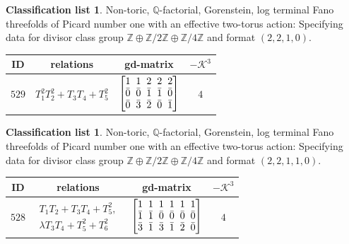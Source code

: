 \documentclass[10pt,a4paper]{amsart}
\theoremstyle{definition}
\newtheorem{class-list}[thm]{Classification list}
\def\ZZ{{\mathbb Z}}
\def\QQ{{\mathbb Q}}
\numberwithin{equation}{section}
\begin{document}
\begin{class-list}\label{class-list(0,2,4)}
Non-toric, $\QQ$-factorial, Gorenstein, log terminal Fano
threefolds of Picard number one with an effective two-torus action:
Specifying data for divisor class group
$\ZZ\oplus \ZZ/2\ZZ\oplus \ZZ/4\ZZ$ and format $(2,2,1,0)$.
\begin{table}[h!]\centering\setlength{\tabcolsep}{5.5pt}
\renewcommand{\arraystretch}{1.1}\small\tabulinesep=1mm
\begin{tabu}{c|c|c|c}
\hline
ID&relations&gd-matrix&$-\mathcal{K}^3$
\\
\hline
${529}$&${T_{1}^{2}T_{2}^{2}+T_{3}T_{4}+T_{5}^{2}}$
&$\arraycolsep=1mm\begin{bmatrix}{1} & {1} & {2} & {2} & {2} \\ {\bar{0}} & {\bar{0}} & {\bar{1}} & {\bar{1}} & {\bar{0}} \\ {\bar{0}} & {\bar{3}} & {\bar{2}} & {\bar{0}} & {\bar{1}}\end{bmatrix}$
&${4}$
\\
\hline
\end{tabu}\vspace{-2mm}
\end{table}
\end{class-list}


\begin{class-list}
Non-toric, $\QQ$-factorial, Gorenstein, log terminal Fano
threefolds of Picard number one with an effective two-torus action:
Specifying data for divisor class group
$\ZZ\oplus \ZZ/2\ZZ\oplus \ZZ/4\ZZ$ and format $(2,2,1,1,0)$.
\begin{table}[h!]\centering\setlength{\tabcolsep}{5.5pt}
\renewcommand{\arraystretch}{1.1}\small\tabulinesep=1mm
\begin{tabu}{c|c|c|c}
\hline
ID&relations&gd-matrix&$-\mathcal{K}^3$
\\
\hline
${528}$&$\begin{array}{r}{T_{1}T_{2}+T_{3}T_{4}+T_{5}^{2}},\\ {\lambda T_{3}T_{4}+T_{5}^{2}+T_{6}^{2}}\end{array}$
&$\arraycolsep=1mm\begin{bmatrix}{1} & {1} & {1} & {1} & {1} & {1} \\ {\bar{1}} & {\bar{1}} & {\bar{0}} & {\bar{0}} & {\bar{0}} & {\bar{0}} \\ {\bar{3}} & {\bar{1}} & {\bar{3}} & {\bar{1}} & {\bar{2}} & {\bar{0}}\end{bmatrix}$&${4}$
\\
\hline
\end{tabu}\vspace{-2mm}
\end{table}
\end{class-list}
\end{document}
